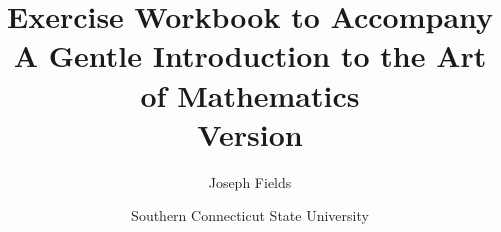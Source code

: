 \documentclass[dvips,12pt,twoside]{book}
\begin{document}
\frontmatter

\title{Exercise Workbook to Accompany \\
A Gentle Introduction to the Art of Mathematics\\ {\small Version \versionNum
{} }}
\author{Joseph Fields}
\date{Southern Connecticut State University}

\maketitle

\clearpage



\clearpage

\mainmatter










\end{document}

